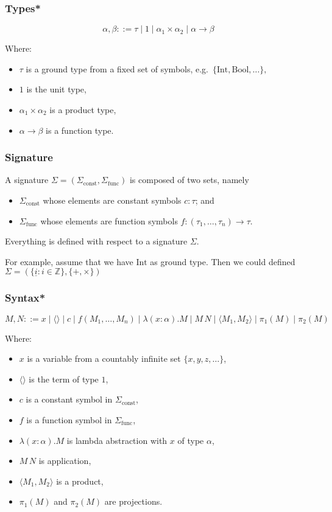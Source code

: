 \documentclass[aspectratio=169]{beamer}
\begin{document}
\begin{frame}
\frametitle{Types*}
\[
\alpha, \beta ::= \tau \mid 1 \mid \alpha_1 \times \alpha_2 \mid \alpha \rightarrow \beta
\]

Where:
\begin{itemize}
    \item $\tau$ is a ground type from a fixed set of symbols, e.g.\ $\{\text{Int}, \text{Bool}, \ldots\},$
    \item $1$ is the unit type,
    \item $\alpha_1 \times \alpha_2$ is a product type,
    \item $\alpha \rightarrow \beta$ is a function type.
\end{itemize}
\end{frame}

\begin{frame}
\frametitle{Signature}
A signature $\Sigma = (\Sigma_{\text{const}}, \Sigma_{\text{func}})$ is composed of two sets, namely
\begin{itemize}
    \item $\Sigma_{\text{const}}$ whose elements are constant symbols $c : \tau$; and
    \item $\Sigma_{\text{func}}$ whose elements are function symbols $f : (\tau_1, \ldots, \tau_n) \to \tau$.
\end{itemize}
Everything is defined with respect to a signature $\Sigma$.

\medskip

For example, assume that we have $\text{Int}$ as ground type.
Then we could defined $\Sigma = \left(\{\underline{i} : i \in \mathbb{Z}\}, \{+, \times\}\right)$ 

\end{frame}

\begin{frame}
\frametitle{Syntax*}

\[
M, N ::= x \mid \langle \rangle \mid c \mid f(M_1, \ldots, M_n) \mid \lambda (x: \alpha). M \mid M \, N \mid \langle M_1, M_2 \rangle \mid \pi_1(M) \mid \pi_2(M)
\]

Where:
\begin{itemize}
    \item $x$ is a variable from a countably infinite set $\{x, y, z, \ldots \}$,
    \item $\langle \rangle$ is the term of type $1$,
    \item $c$ is a constant symbol in $\Sigma_{\text{const}}$,
    \item $f$ is a function symbol in $\Sigma_{\text{func}}$,
    \item $\lambda (x: \alpha). M$ is lambda abstraction with $x$ of type $\alpha$,
    \item $M\, N$ is application,
    \item $\langle M_1, M_2 \rangle$ is a product,
    \item $\pi_1(M)$ and $\pi_2(M)$ are projections.
\end{itemize}
\end{frame}
\end{document}
